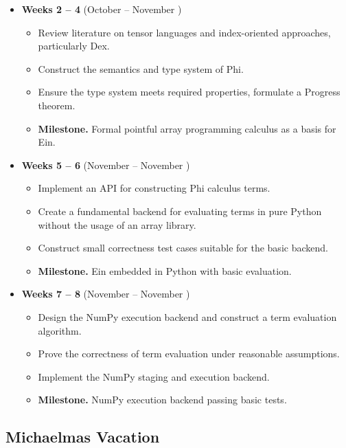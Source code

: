 \begin{itemize}
    \item \textbf{Weeks 2 -- 4} (October  -- November )  \begin{itemize}
        \item Review literature on tensor languages and index-oriented approaches, particularly Dex.
        \item Construct the semantics and type system of Phi.
        \item Ensure the type system meets required properties, formulate a Progress theorem.
        \item \textbf{Milestone.} Formal pointful array programming calculus as a basis for Ein.
    \end{itemize}
    \item \textbf{Weeks 5 -- 6} (November  -- November ) 
 \begin{itemize}
        \item Implement an API for constructing Phi calculus terms.     
        \item Create a fundamental backend for evaluating terms in pure Python without the usage of an array library.
        \item Construct small correctness test cases suitable for the basic backend.
        \item \textbf{Milestone.} Ein embedded in Python with basic evaluation.
    \end{itemize}
    \item \textbf{Weeks 7 -- 8} (November  -- November ) \begin{itemize}
        \item Design the NumPy execution backend and construct a term evaluation algorithm.
        \item Prove the correctness of term evaluation under reasonable assumptions.
        \item Implement the NumPy staging and execution backend.
        \item \textbf{Milestone.} NumPy execution backend passing basic tests.
    \end{itemize}
\end{itemize}

\subsection{Michaelmas Vacation}

